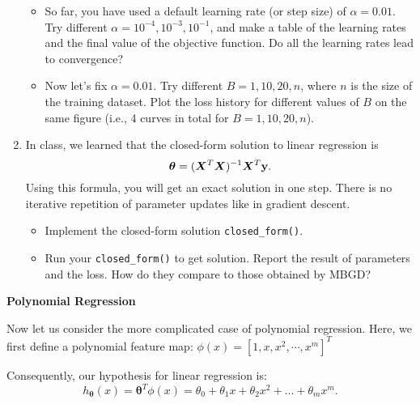 \documentclass[11pt]{article}
\begin{document}
\begin{enumerate}[resume]
\begin{itemize}
\item  {} So far, you have used a default learning rate (or step size) of $\alpha = 0.01$. Try different $\alpha = 10^{-4}, 10^{-3}, 10^{-1}$, and make a table of the learning rates and the final value of the objective function. Do all the learning rates lead to convergence? \\

\item  {} Now let's fix $\alpha = 0.01$. Try different $B = 1, 10, 20, n$, where $n$ is the size of the training dataset.  Plot the loss history for different values of $B$ on the same figure (i.e., 4 curves in total for $B = 1, 10, 20, n$).
\\
\end{itemize}

\item  {} In class, we learned that the closed-form solution to linear regression is
\begin{equation*}
\boldsymbol{\theta} = (\boldsymbol{X}^T \boldsymbol{X})^{-1} \boldsymbol{X}^T {\mathbf y}.
\end{equation*}
Using this formula, you will get an exact solution in one step. There is no iterative repetition of parameter updates like in gradient descent.

\begin{itemize}
\item  Implement the closed-form solution \verb|closed_form()|.

\item  Run your \verb|closed_form()| to get solution. Report the result of parameters and the loss. How do they compare to those obtained by MBGD?  \\

\end{itemize}



\end{enumerate}



\vspace{10pt} {\large \textbf{Polynomial Regression}}

Now let us consider the more complicated case of polynomial regression.
Here, we first define a polynomial feature map:
$\phi(x) = [1, x, x^2, \cdots, x^m]^T$

Consequently, our hypothesis for linear regression is:
\begin{equation*}
h_{\boldsymbol{\theta}}(x) = \boldsymbol{\theta}^T \phi(x) = \theta_0  + \theta_1 x + \theta_2 x^2 + \ldots + \theta_m x^m.
\end{equation*}
\end{document}
